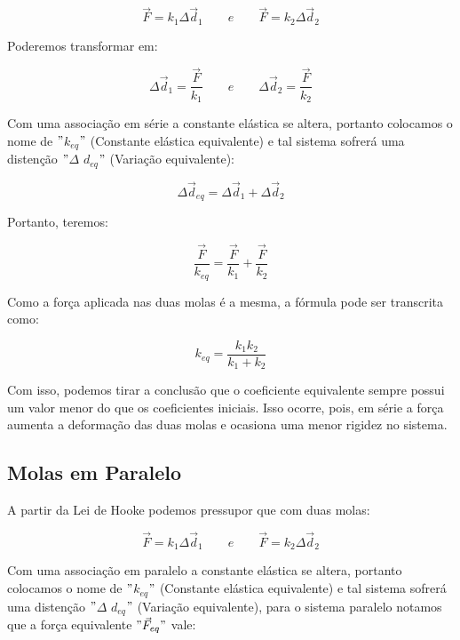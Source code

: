 \documentclass[
	12pt,				%
	oneside,			%
	a4paper,			%
	english,			%
	french,				%
	spanish,			%
	brazil,				%
	]{abntex2}
\begin{document}
\begin{center}
\[
 \vec{F} = k_{1}\Delta\vec{d}_{1} \qquad e \qquad \vec{F} = k_{2}\Delta\vec{d}_{2} 
\]
\end{center}

Poderemos transformar em:

\begin{center}
\[
  \Delta\vec{d}_{1} = \frac{\vec{F}}{k_{1}} \qquad e \qquad \Delta\vec{d}_{2} = \frac{\vec{F}}{k_{2}}
\]
\end{center}

Com uma associação em série a constante elástica se altera, portanto colocamos o nome de $"$$k_{eq}$$"$ (Constante elástica equivalente) e tal sistema sofrerá uma distenção $"$$\Delta$ $d_{eq}$$"$ (Variação equivalente):

\begin{center}
\[
 \Delta\vec{d}_{eq} = \Delta\vec{d}_{1} + \Delta\vec{d}_{2}
\]
\end{center}

Portanto, teremos:

\begin{center}
\[
 \frac{\vec{F}}{k_{eq}} = \frac{\vec{F}}{k_{1}} + \frac{\vec{F}}{k_{2}}
\]
\end{center}

Como a força aplicada nas duas molas é a mesma, a fórmula pode ser transcrita como:

\begin{center}
\[
 k_{eq} = \frac{k_{1}k_{2}}{k_{1} + k_{2}}
\]
\end{center}
	
Com isso, podemos tirar a conclusão que o coeficiente equivalente sempre possui um valor menor do que os coeficientes iniciais. Isso ocorre, pois, em série a força aumenta a deformação das duas molas e ocasiona uma menor rigidez no sistema. \cite{UFC}

\subsection[Molas em Paralelo]{Molas em Paralelo}

A partir da Lei de Hooke podemos pressupor que com duas molas:

\begin{center}
\[
 \vec{F} = k_{1}\Delta\vec{d}_{1} \qquad e \qquad \vec{F} = k_{2}\Delta\vec{d}_{2} 
\]
\end{center}

Com uma associação em paralelo a constante elástica se altera, portanto colocamos o nome de $"$$k_{eq}$$"$ (Constante elástica equivalente) e tal sistema sofrerá uma distenção $"$$\Delta$ $d_{eq}$$"$ (Variação equivalente), para o sistema paralelo notamos que a força equivalente $"\vec{F}_{eq}"$ vale:
\end{document}
